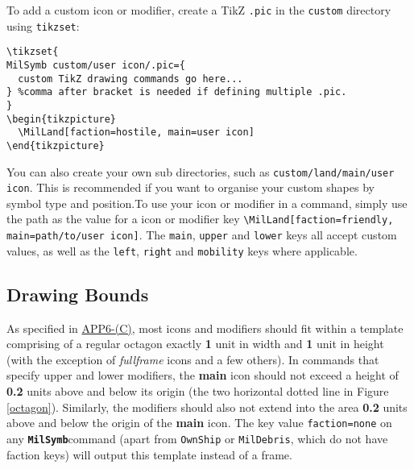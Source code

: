 \documentclass[a4paper, titlepage]{article}
\newcommand\MilSymb{\textbf{\texttt{MilSymb}}}
\newcommand\DocLink{\href{https://www.awl.edu.pl/images/en/APP_6_C.pdf}{APP6-(C)}}
\newenvironment{writett}{\ttfamily}{\par}
\begin{document}
To add a custom icon or modifier, create a TikZ \texttt{.pic} in the \texttt{custom} directory using \texttt{tikzset}:

\begin{writett}
\begin{verbatim}
\tikzset{
MilSymb custom/user icon/.pic={
  custom TikZ drawing commands go here...
} %comma after bracket is needed if defining multiple .pic.
}
\begin{tikzpicture}
  \MilLand[faction=hostile, main=user icon]
\end{tikzpicture}
\end{verbatim}
\end{writett}

You can also create your own sub directories, such as \texttt{custom/land/main/user icon}. This is recommended if you want to organise your custom shapes by symbol type and position.To use your icon or modifier in a command, simply use the path as the value for a icon or modifier key \texttt{\textbackslash MilLand[faction=friendly, main=path/to/user icon]}. The \texttt{main}, \texttt{upper} and \texttt{lower} keys all accept custom values, as well as the \texttt{left}, \texttt{right} and \texttt{mobility} keys where applicable.

\subsection{Drawing Bounds}

As specified in \DocLink, most icons and modifiers should fit within a template comprising of a regular octagon exactly \textbf{1} unit in width and \textbf{1} unit in height (with the exception of \textit{fullframe} icons and a few others). In commands that specify upper and lower modifiers, the \textbf{main} icon should not exceed a height of \textbf{0.2} units above and below its origin (the two horizontal dotted line in Figure \ref{octagon}). Similarly, the modifiers should also not extend into the area \textbf{0.2} units above and below the origin of the \textbf{main} icon. The key value \texttt{faction=none} on any \MilSymb command (apart from \texttt{OwnShip} or \texttt{MilDebris}, which do not have faction keys) will output this template instead of a frame.
\end{document}
